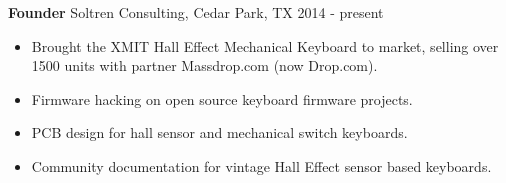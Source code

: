 \textbf{Founder}
Soltren Consulting, Cedar Park, TX \hfill 2014 - present

\begin{itemize} \itemsep -2pt

\item Brought the XMIT Hall Effect Mechanical Keyboard to market,
      selling over 1500 units with partner Massdrop.com (now Drop.com).
\item Firmware hacking on open source keyboard firmware projects.
\item PCB design for hall sensor and mechanical switch keyboards.
\item Community documentation for vintage Hall Effect sensor based
      keyboards.

\end{itemize}
